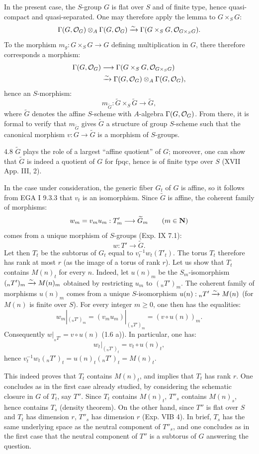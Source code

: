 In the present case, the $S$-group $G$ is flat over $S$ and of finite type, hence quasi-compact and quasi-separated. One may therefore apply the lemma to $G\times_S G$:
\[
\Gamma(G,\mathcal{O}_G)\otimes_A\Gamma(G,\mathcal{O}_G)\xrightarrow{\sim}\Gamma(G\times_S G,\mathcal{O}_{G\times_S G}).
\]
To the morphism $m_g:G\times_S G\to G$ defining multiplication in $G$, there therefore corresponds a morphism:
\[
\begin{aligned}
\Gamma(G,\mathcal{O}_G)&\longrightarrow\Gamma(G\times_S G,\mathcal{O}_{G\times_S G})\\
&\xrightarrow{\sim}\Gamma(G,\mathcal{O}_G)\otimes_A\Gamma(G,\mathcal{O}_G),
\end{aligned}
\]
hence an $S$-morphism:
\[
m_{\widetilde G}:\widetilde G\times_S\widetilde G\to\widetilde G,
\]
where $\widetilde G$ denotes the affine $S$-scheme with $A$-algebra $\Gamma(G,\mathcal{O}_G)$. From there, it is formal to verify that $m_{\widetilde G}$ gives $\widetilde G$ a structure of group $S$-scheme such that the canonical morphism $v:G\to\widetilde G$ is a morphism of $S$-groups.
\begin{remark}{4.8}\label{XV.4.8}
$\widetilde G$ plays the role of a largest ``affine quotient'' of $G$; moreover, one can show that $\widetilde G$ is indeed a quotient of $G$ for fpqc, hence is of finite type over $S$ (XVII App. III, 2).
\end{remark}

In the case under consideration, the generic fiber $G_t$ of $G$ is affine, so it follows from EGA I 9.3.3 that $v_t$ is an isomorphism. Since $\widetilde G$ is affine, the coherent family of morphisms:
\[
w_m=v_mu_m:T'_m\longrightarrow\widetilde G_m\qquad(m\in\mathbf{N})
\]
comes from a unique morphism of $S$-groups (Exp. IX 7.1):
\[
w:T'\to\widetilde G.
\]
Let then $T_t$ be the subtorus of $G_t$ equal to $v_t^{-1}w_t(T'_t)$. The torus $T_t$ therefore has rank at most $r$ (as the image of a torus of rank $r$). Let us show that $T_t$ contains $M(n)_t$ for every $n$. Indeed, let $u(n)_m$ be the $S_m$-isomorphism $({}_nT')_m\xrightarrow{\sim} M(n)_m$ obtained by restricting $u_m$ to $({}_nT')_m$. The coherent family of morphisms $u(n)_m$ comes from a unique $S$-isomorphism $u(n):{}_nT'\xrightarrow{\sim} M(n)$ (for $M(n)$ is finite over $S$). For every integer $m\geq0$, one then has the equalities:
\[
w_m|_{({}_nT')_m}=(v_mu_m)|_{({}_nT')_m}=(v\circ u(n))_m.
\]
Consequently $w|_{{}_nT'}=v\circ u(n)$ (1.6 a)). In particular, one has:
\[
w_t|_{({}_nT')_t}=v_t\circ u(n)_t,
\]
hence $v_t^{-1}w_t({}_nT')_t=u(n)_t({}_nT')_t=M(n)_t$.

This indeed proves that $T_t$ contains $M(n)_t$, and implies that $T_t$ has rank $r$. One concludes as in the first case already studied, by considering the schematic closure in $G$ of $T_t$, say $T''$. Since $T_t$ contains $M(n)_t$, $T''_s$ contains $M(n)_s$, hence contains $T_s$ (density theorem). On the other hand, since $T''$ is flat over $S$ and $T_t$ has dimension $r$, $T''_s$ has dimension $r$ (Exp. VIB 4). In brief, $T_s$ has the same underlying space as the neutral component of $T''_s$, and one concludes as in the first case that the neutral component of $T''$ is a subtorus of $G$ answering the question.

